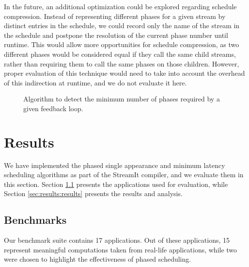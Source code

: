 \documentclass{sig-alt-full}
\begin{document}

In the future, an additional optimization could be explored regarding
schedule compression.  Instead of representing different phases for a
given stream by distinct entries in the schedule, we could record only
the name of the stream in the schedule and postpone the resolution of
the current phase number until runtime.  This would allow more
opportunities for schedule compression, as two different phases would
be considered equal if they call the same child streams, rather than
requiring them to call the same phases on those children.  However,
proper evaluation of this technique would need to take into account
the overhead of this indirection at runtime, and we do not evaluate it
here.

\begin{figure}
\vspace{-16pt}
\caption{\small Algorithm to detect the minimum number of phases required by
a given feedback loop.\protect\label{fig:feedalg}}
\end{figure}

%
%
%

\section{Results}
\label{chpt:results}

We have implemented the phased single appearance and minimum latency
scheduling algorithms as part of the StreamIt compiler, and we
evaluate them in this section.  Section \ref{sec:results:apps}
presents the applications used for evaluation, while Section
\ref{sec:results:results} presents the results and analysis.

\subsection{Benchmarks}
\label{sec:results:apps}

Our benchmark suite contains 17 applications. Out of these
applications, 15 represent meaningful computations taken from
real-life applications, while two were chosen to highlight the
effectiveness of phased scheduling.
\end{document}
